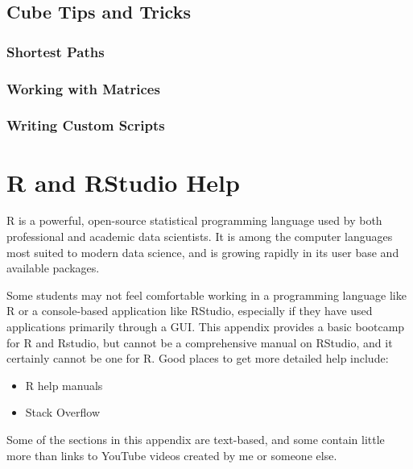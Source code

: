 \documentclass[
]{book}
\providecommand{\tightlist}{%
  \setlength{\itemsep}{0pt}\setlength{\parskip}{0pt}}
\begin{document}
\hypertarget{cube-tips-and-tricks}{%
\section{Cube Tips and Tricks}\label{cube-tips-and-tricks}}

\hypertarget{shortest-paths}{%
\subsection{Shortest Paths}\label{shortest-paths}}

\hypertarget{working-with-matrices}{%
\subsection{Working with Matrices}\label{working-with-matrices}}

\hypertarget{writing-custom-scripts}{%
\subsection{Writing Custom Scripts}\label{writing-custom-scripts}}

\hypertarget{app-rstudio}{%
\chapter{R and RStudio Help}\label{app-rstudio}}

R is a powerful, open-source statistical programming language used by both
professional and academic data scientists. It is among the computer languages
most suited to modern data science, and is growing rapidly in its user base and
available packages.

Some students may not feel comfortable working in a programming language like R or
a console-based application like RStudio, especially if they have used applications
primarily through a GUI.
This appendix provides a basic bootcamp for R and Rstudio, but cannot be a
comprehensive manual on RStudio, and it certainly cannot be one for R. Good
places to get more detailed help include:

\begin{itemize}
\tightlist
\item
  R help manuals
\item
  Stack Overflow
\end{itemize}

Some of the sections in this appendix are text-based, and some contain little
more than links to YouTube videos created by me or someone else.
\end{document}
